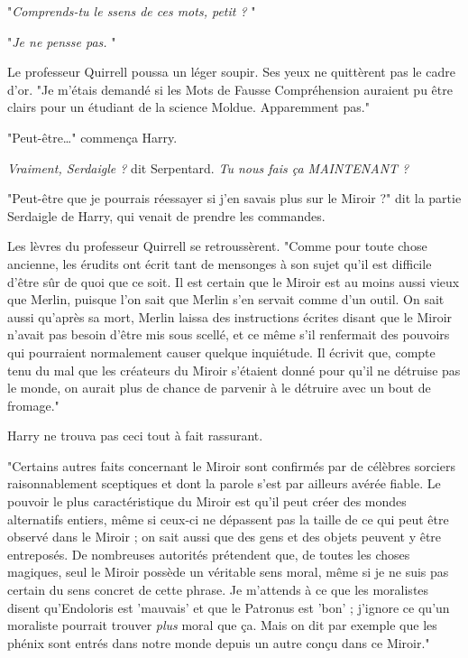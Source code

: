 "\emph{Comprends-tu le ssens de ces mots, petit ?} "

"\emph{Je ne pensse pas.} "

Le professeur Quirrell poussa un léger soupir. Ses yeux ne quittèrent pas le cadre d'or. "Je m'étais demandé si les Mots de Fausse Compréhension auraient pu être clairs pour un étudiant de la science Moldue. Apparemment pas."

"Peut-être…" commença Harry.

\emph{Vraiment, Serdaigle ?}  dit Serpentard. \emph{Tu nous fais ça MAINTENANT ?} 

"Peut-être que je pourrais réessayer si j'en savais plus sur le Miroir ?" dit la partie Serdaigle de Harry, qui venait de prendre les commandes.

Les lèvres du professeur Quirrell se retroussèrent. "Comme pour toute chose ancienne, les érudits ont écrit tant de mensonges à son sujet qu'il est difficile d'être sûr de quoi que ce soit. Il est certain que le Miroir est au moins aussi vieux que Merlin, puisque l'on sait que Merlin s'en servait comme d'un outil. On sait aussi qu'après sa mort, Merlin laissa des instructions écrites disant que le Miroir n'avait pas besoin d'être mis sous scellé, et ce même s'il renfermait des pouvoirs qui pourraient normalement causer quelque inquiétude. Il écrivit que, compte tenu du mal que les créateurs du Miroir s'étaient donné pour qu'il ne détruise pas le monde, on aurait plus de chance de parvenir à le détruire avec un bout de fromage."

Harry ne trouva pas ceci tout à fait rassurant.

"Certains autres faits concernant le Miroir sont confirmés par de célèbres sorciers raisonnablement sceptiques et dont la parole s'est par ailleurs avérée fiable. Le pouvoir le plus caractéristique du Miroir est qu'il peut créer des mondes alternatifs entiers, même si ceux-ci ne dépassent pas la taille de ce qui peut être observé dans le Miroir ; on sait aussi que des gens et des objets peuvent y être entreposés. De nombreuses autorités prétendent que, de toutes les choses magiques, seul le Miroir possède un véritable sens moral, même si je ne suis pas certain du sens concret de cette phrase. Je m'attends à ce que les moralistes disent qu'Endoloris est 'mauvais' et que le Patronus est 'bon' ; j'ignore ce qu'un moraliste pourrait trouver \emph{plus}  moral que ça. Mais on dit par exemple que les phénix sont entrés dans notre monde depuis un autre conçu dans ce Miroir."

